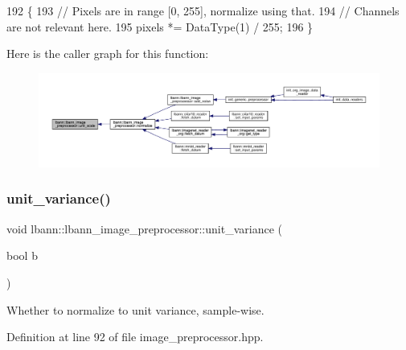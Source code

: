 \begin{DoxyCode}
192                            \{
193   \textcolor{comment}{// Pixels are in range [0, 255], normalize using that.}
194   \textcolor{comment}{// Channels are not relevant here.}
195   pixels *= DataType(1) / 255;
196 \}
\end{DoxyCode}
Here is the caller graph for this function\+:\nopagebreak
\begin{figure}[H]
\begin{center}
\leavevmode
\includegraphics[width=350pt]{classlbann_1_1lbann__image__preprocessor_aa7a8926d0544100f7d3caa9289d94826_icgraph}
\end{center}
\end{figure}
\mbox{\label{classlbann_1_1lbann__image__preprocessor_a05c4cb5cb842df5d46eebe15c6ea9de3}} 
\subsubsection{\texorpdfstring{unit\+\_\+variance()}{unit\_variance()}\hspace{0.1cm}{\footnotesize\ttfamily [1/2]}}
{\footnotesize\ttfamily void lbann\+::lbann\+\_\+image\+\_\+preprocessor\+::unit\+\_\+variance (\begin{DoxyParamCaption}\item[{bool}]{b }\end{DoxyParamCaption})\hspace{0.3cm}{\ttfamily [inline]}}

Whether to normalize to unit variance, sample-\/wise. 

Definition at line 92 of file image\+\_\+preprocessor.\+hpp.


